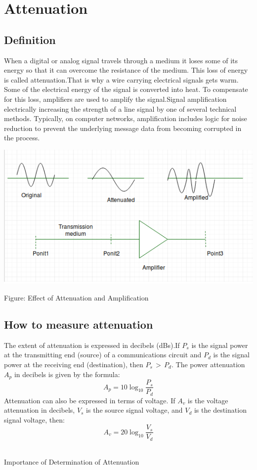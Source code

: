 \documentclass[12pt,a4paper]{article}%
\begin{document}
	\section{Attenuation}
	\begin{flushleft}
		
		\subsection{Definition} 
		\begin{flushleft}
		When a digital or analog signal travels through a medium it loses some of its energy so that it can overcome the resistance of the medium. This loss of energy is called attenuation.That is why a wire carrying electrical signals gets warm. Some of the electrical energy of the signal is converted into heat. To compensate for this loss, amplifiers are used to amplify the signal.Signal amplification electrically increasing the strength of a line signal by one of several technical methods. Typically, on computer networks, amplification includes logic for noise reduction to prevent the underlying message data from becoming corrupted in the process.
		
		\end{flushleft}
		
		\begin{center}
			\includegraphics[width=0.80 \textwidth]{./images/NKK1.png}
		\end{center}
		\begin{center}
			Figure: Effect of Attenuation and Amplification
		\end{center}
		
		\subsection{How to measure attenuation} 
		\begin{flushleft}
		The extent of attenuation is expressed in decibels (dBs).If $P_s$ is the signal power at the transmitting end (source) of a communications circuit and $P_d$ is the signal power at the receiving end (destination), then $P_s\, >\, P_d$. The power attenuation $A_p$ in decibels is given by the formula:
		$$A_p= 10\log_{10}{\frac{P_s}{P_d}}$$
		Attenuation can also be expressed in terms of voltage. If $A_v$ is the voltage attenuation in decibels, $V_s$ is the source signal voltage, and $V_d$ is the destination signal voltage, then:$$A_v= 20\log_{10}{\frac{V_s}{V_d}}$$\\\bigskip
		\item Importance of Determination of Attenuation

\end{flushleft}
\end{flushleft}
\end{document}
